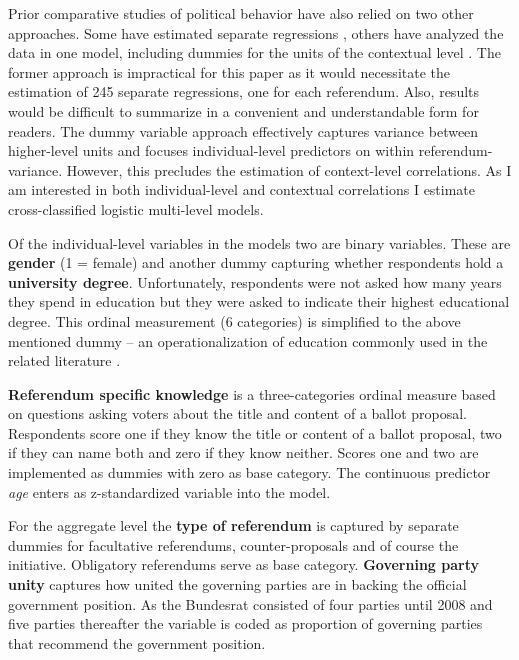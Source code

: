 \documentclass[11pt,a4paper]{article}\usepackage[]{graphicx}\usepackage[]{color}
\begin{document}
	Prior comparative studies of political behavior have also relied on two other approaches. Some have estimated separate regressions \citep[e.g.][]{lutz_low_2007}, others have analyzed the data in one model, including dummies for the units of the contextual level 
    \citep[e.g.][]{eichenberg_europeans_1993}. The former approach is impractical for this paper as it would necessitate the estimation of 245 separate regressions, one for each referendum. Also, results would be difficult to summarize in a convenient and understandable form for readers. The dummy variable approach effectively captures variance between higher-level units and focuses individual-level predictors on within referendum-variance. However, this precludes the estimation of context-level correlations. As I am interested in both individual-level and contextual correlations I estimate cross-classified logistic multi-level models. 
    
    Of the individual-level variables in the models two are binary variables. These are \textbf{gender} (1 = female) and another dummy capturing whether respondents hold a \textbf{university degree}. Unfortunately, respondents were not asked how many years they spend in education but they were asked to indicate their highest educational degree. This ordinal measurement (6 categories) is simplified to the above mentioned dummy -- an operationalization of education commonly used in the related literature \citep[5]{vatter_who_2014}. 
    
    \textbf{Referendum specific knowledge} is a three-categories ordinal measure based on questions asking voters about the title and content of a ballot proposal. Respondents score one if they know the title or content of a ballot proposal, two if they can name both and zero if they know neither. Scores one and two are implemented as dummies with zero as base category. The continuous predictor \textit{age} enters as z-standardized variable into the model.  
    
    
    For the aggregate level the \textbf{type of referendum} is captured by separate dummies for facultative referendums, counter-proposals and of course the initiative. Obligatory referendums serve as base category.
    \textbf{Governing party unity} captures how united the governing parties are in backing the official government position. As the Bundesrat consisted of four parties until 2008 and five parties thereafter the variable is coded as proportion of governing parties that recommend the government position.
    
\end{document}
